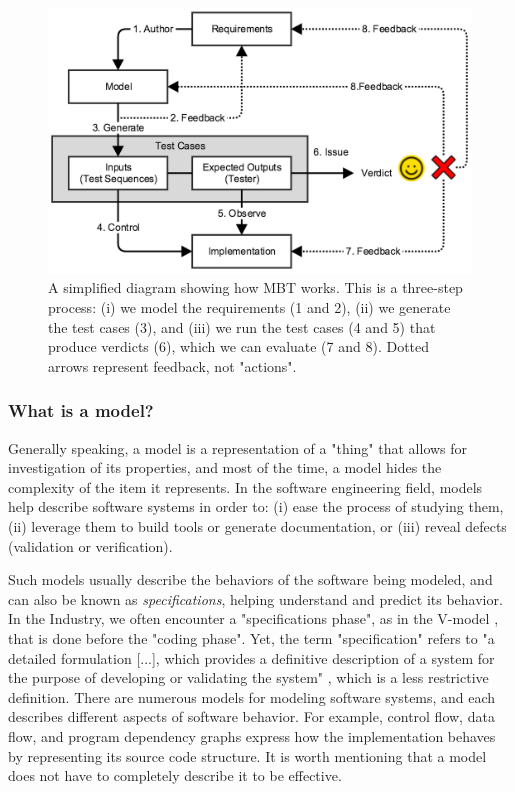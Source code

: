\begin{figure}[ht]
    \begin{center}
    \includegraphics[width=1.0\linewidth]{figures/mbt.png}
    \end{center}

    \caption{A simplified diagram showing how MBT works. This is
    a three-step process: (i) we model the requirements (1 and
    2), (ii) we generate the test cases (3), and (iii) we run the
    test cases (4 and 5) that produce verdicts (6), which we can
    evaluate (7 and 8). Dotted arrows represent feedback, not
    "actions".}
    \label{fig:mbt}
\end{figure}

\subsubsection{What is a model?}
\label{sec:related:testing:model}

Generally speaking, a model is a representation of a "thing" that
allows for investigation of its properties, and most of the time,
a model hides the complexity of the item it represents. In the
software engineering field, models help describe software systems
in order to: (i) ease the process of studying them, (ii) leverage
them to build tools or generate documentation, or (iii) reveal
defects (validation or verification).

Such models usually describe the behaviors of the software being
modeled, and can also be known as \emph{specifications}, helping
understand and predict its behavior. In the Industry, we often
encounter a "specifications phase", as in the V-model
\cite{rook1986controlling,mathur2010advancements}, that is done
before the "coding phase". Yet, the term "specification" refers
to "a detailed formulation [...], which provides a definitive
description of a system for the purpose of developing or
validating the system" \cite{5733835}, which is a less
restrictive definition.  There are numerous models for modeling
software systems, and each describes different aspects of
software behavior. For example, control flow, data flow, and
program dependency graphs express how the implementation behaves
by representing its source code structure. It is worth mentioning
that a model does not have to completely describe it to be
effective.

